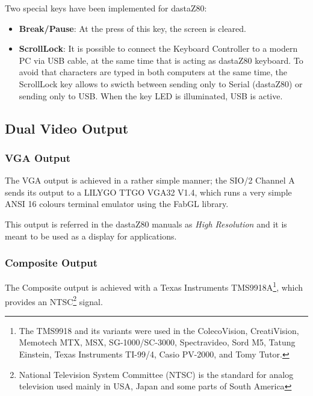 \documentclass[a4paper,11pt]{article}
\begin{document}
    Two special keys have been implemented for dastaZ80:

    \begin{itemize}
        \item \textbf{Break/Pause}: At the press of this key, the screen is
        cleared.
        \item \textbf{ScrollLock}: It is possible to connect the Keyboard
        Controller to a modern PC via USB cable, at the same time that is acting
        as dastaZ80 keyboard. To avoid that characters are typed in both
        computers at the same time, the ScrollLock key allows to swicth between
        sending only to Serial (dastaZ80) or sending only to USB. When the key
        LED is illuminated, USB is active.
    \end{itemize}

    \subsection{Dual Video Output}

    \subsubsection{VGA Output}
    \label{vga}

    The VGA output is achieved in a rather simple manner; the SIO/2 Channel A
    sends its output to a LILYGO TTGO VGA32 V1.4, which runs a very simple ANSI
    16 colours terminal emulator using the FabGL library.

    This output is referred in the dastaZ80 manuals as \textit{High Resolution}
    and it is meant to be used as a display for applications.

    \subsubsection{Composite Output}

    The Composite output is achieved with a Texas Instruments TMS9918A\footnote
    {The TMS9918 and its variants were used in the ColecoVision,
    CreatiVision, Memotech MTX, MSX, SG-1000/SC-3000, Spectravideo, Sord M5,
    Tatung Einstein, Texas Instruments TI-99/4, Casio PV-2000, and Tomy Tutor.},
    which provides an NTSC\footnote{National Television System Committee (NTSC)
    is the standard for analog television used mainly in USA, Japan and some
    parts of South America} signal.
\end{document}
